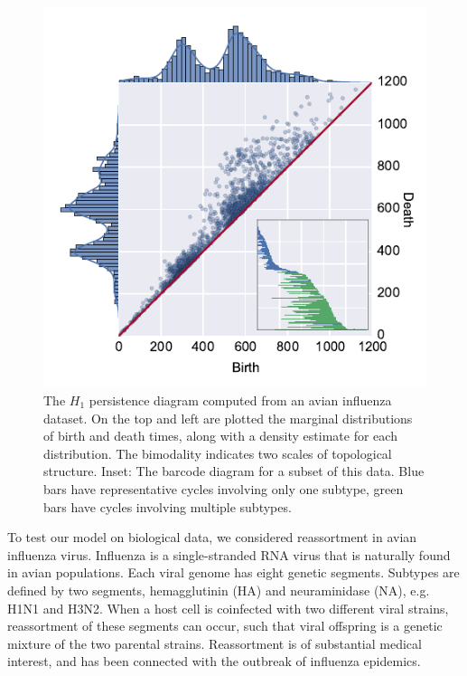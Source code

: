 \begin{figure}
\begin{center}
\centerline{\includegraphics[width=\columnwidth]{./fig/flu_scatterplot.pdf}}
\caption[$H_1$ persistence diagram computed from an avian influenza dataset.]{The $H_1$ persistence diagram computed from an avian influenza dataset. On the top and left are plotted the marginal distributions of birth and death times, along with a density estimate for each distribution. The bimodality indicates two scales of topological structure. Inset: The barcode diagram for a subset of this data. Blue bars have representative cycles involving only one subtype, green bars have cycles involving multiple subtypes.}
\label{fig:flu_scatterplot}
\end{center}
\end{figure}

To test our model on biological data, we considered reassortment in avian influenza virus.
Influenza is a single-stranded RNA virus that is naturally found in avian populations.
Each viral genome has eight genetic segments.
Subtypes are defined by two segments, hemagglutinin (HA) and neuraminidase (NA), e.g. H1N1 and H3N2.
When a host cell is coinfected with two different viral strains, reassortment of these segments can occur, such that viral offspring is a genetic mixture of the two parental strains.
Reassortment is of substantial medical interest, and has been connected with the outbreak of influenza epidemics.

